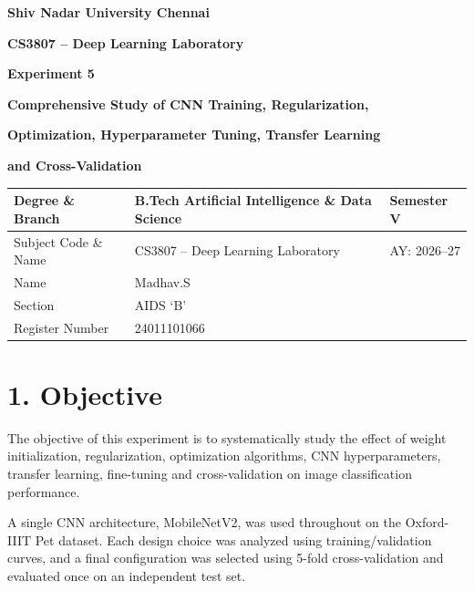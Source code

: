 \documentclass[10pt]{article}
\begin{document}

\begin{center}

{\large\textbf{Shiv Nadar University Chennai}}

\vspace{2mm}

{\normalsize\textbf{CS3807 -- Deep Learning Laboratory}}

\vspace{2mm}

{\large\textbf{Experiment 5}}

\vspace{1mm}

{\normalsize\textbf{Comprehensive Study of CNN Training, Regularization,}}

{\normalsize\textbf{Optimization, Hyperparameter Tuning, Transfer Learning}}

{\normalsize\textbf{and Cross-Validation}}

\end{center}

\vspace{3mm}

\begin{tabular}{|p{3.4cm}|p{9.0cm}|p{1.4cm}|}
\hline
Degree \& Branch &
B.Tech Artificial Intelligence \& Data Science &
Semester V\\
\hline
Subject Code \& Name &
CS3807 -- Deep Learning Laboratory &
AY: 2026--27\\
\hline
Name & Madhav.S & \\
\hline
Section & AIDS `B' & \\
\hline
Register Number & 24011101066 & \\
\hline
\end{tabular}

\section*{1. Objective}

The objective of this experiment is to systematically study the effect of
weight initialization, regularization, optimization algorithms, CNN
hyperparameters, transfer learning, fine-tuning and cross-validation on
image classification performance.

A single CNN architecture, MobileNetV2, was used throughout on the
Oxford-IIIT Pet dataset. Each design choice was analyzed using
training/validation curves, and a final configuration was selected
using 5-fold cross-validation and evaluated once on an independent
test set.
\end{document}
